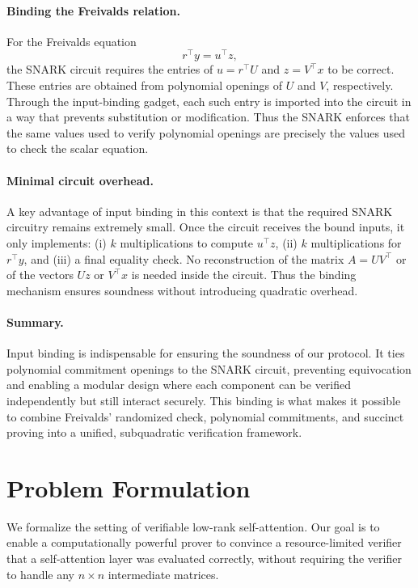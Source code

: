 \documentclass[11pt]{article}
\begin{document}
\paragraph{Binding the Freivalds relation.}
For the Freivalds equation
\[
  r^\top y = u^\top z,
\]
the SNARK circuit requires the entries of $u = r^\top U$ and $z =
V^\top x$ to be correct.
These entries are obtained from polynomial openings of $U$ and $V$,
respectively.
Through the input-binding gadget, each such entry is imported into the
circuit in a way that prevents substitution or modification.
Thus the SNARK enforces that the same values used to verify polynomial
openings are precisely the values used to check the scalar equation.

\paragraph{Minimal circuit overhead.}
A key advantage of input binding in this context is that the required
SNARK circuitry remains extremely small.
Once the circuit receives the bound inputs, it only implements:
(i) $k$ multiplications to compute $u^\top z$,  
(ii) $k$ multiplications for $r^\top y$, and  
(iii) a final equality check.
No reconstruction of the matrix $A = U V^\top$ or of the vectors
$U z$ or $V^\top x$ is needed inside the circuit.
Thus the binding mechanism ensures soundness without introducing
quadratic overhead.

\paragraph{Summary.}
Input binding is indispensable for ensuring the soundness of our
protocol.
It ties polynomial commitment openings to the SNARK circuit, preventing
equivocation and enabling a modular design where each component can be
verified independently but still interact securely.
This binding is what makes it possible to combine Freivalds' randomized
check, polynomial commitments, and succinct proving into a unified,
subquadratic verification framework.


\section{Problem Formulation}

We formalize the setting of verifiable low-rank self-attention.
Our goal is to enable a computationally powerful prover to convince a
resource-limited verifier that a self-attention layer was evaluated
correctly, without requiring the verifier to handle any $n \times n$
intermediate matrices.
\end{document}
